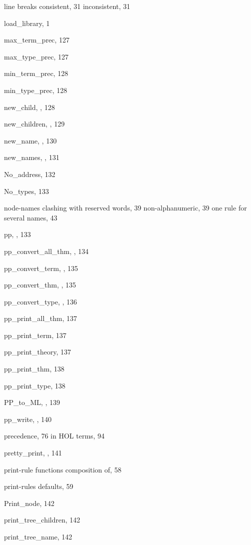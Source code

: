 \begin{theindex}
  \indexspace

  \item line breaks
    \subitem consistent, 31
    \subitem inconsistent, 31
  \item {\ptt load\_library}, 1

  \indexspace

  \item {\ptt max\_term\_prec}, 127
  \item {\ptt max\_type\_prec}, 127
  \item {\ptt min\_term\_prec}, 128
  \item {\ptt min\_type\_prec}, 128

  \indexspace

  \item {\ptt new\_child}, , 128
  \item {\ptt new\_children}, , 129
  \item {\ptt new\_name}, , 130
  \item {\ptt new\_names}, , 131
  \item {\ptt No\_address}, 132
  \item {\ptt No\_types}, 133
  \item node-names
    \subitem clashing with reserved words, 39
    \subitem non-alphanumeric, 39
    \subitem one rule for several names, 43

  \indexspace

  \item {\ptt pp}, , 133
  \item {\ptt pp\_convert\_all\_thm}, , 134
  \item {\ptt pp\_convert\_term}, , 135
  \item {\ptt pp\_convert\_thm}, , 135
  \item {\ptt pp\_convert\_type}, , 136
  \item {\ptt pp\_print\_all\_thm}, 137
  \item {\ptt pp\_print\_term}, 137
  \item {\ptt pp\_print\_theory}, 137
  \item {\ptt pp\_print\_thm}, 138
  \item {\ptt pp\_print\_type}, 138
  \item {\ptt PP\_to\_ML}, , 139
  \item {\ptt pp\_write}, , 140
  \item precedence, 76
    \subitem in HOL terms, 94
  \item {\ptt pretty\_print}, , 141
  \item print-rule functions
    \subitem composition of, 58
  \item print-rules
    \subitem defaults, 59
  \item {\ptt Print\_node}, 142
  \item {\ptt print\_tree\_children}, 142
  \item {\ptt print\_tree\_name}, 142


\end{theindex}
